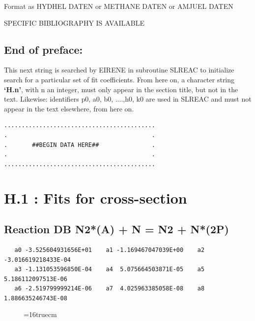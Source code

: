 \documentclass[12pt,dvipdfm]{article}
\begin{document}
Format as HYDHEL DATEN \cite{kn:Janev}
or METHANE DATEN \cite{kn:Ehrhardt} or AMJUEL DATEN

SPECIFIC BIBLIOGRAPHY IS AVAILABLE

\subsection*{End of preface:}
This next string is searched by EIRENE in subroutine SLREAC
to initialize search for a particular set of fit coefficients.
From here on, a character string \textbf{`H.n'}, with n an integer, must only appear in the
section title,
but not in the text. Likewise: identifiers p0, a0, b0, ....,h0, k0 are used
in SLREAC and must not
appear in the text elsewhere, from here on.

\bigskip
\begin{small}\begin{verbatim}
...........................................
.                                         .
.       ##BEGIN DATA HERE##               .
.                                         .
...........................................
\end{verbatim}\end{small}
\newpage

\setcounter{section}{0}

\section{H.1 : Fits for cross-section }

\subsection{
Reaction DB N2*(A) + N  = N2 + N*(2P)}
\begin{small}\begin{verbatim}
   a0 -3.525604931656E+01    a1 -1.169467047039E+00    a2 -3.016619218433E-04
   a3 -1.131053596850E-04    a4  5.075664503871E-05    a5  5.186112097513E-06
   a6 -2.519799999214E-06    a7  4.025963385058E-08    a8  1.886635246743E-08
   \end{verbatim}\end{small}
\begin{figure}[h!]
\label{n2rates}
\epsfxsize=16truecm
\end{figure}
\newpage
\end{document}
